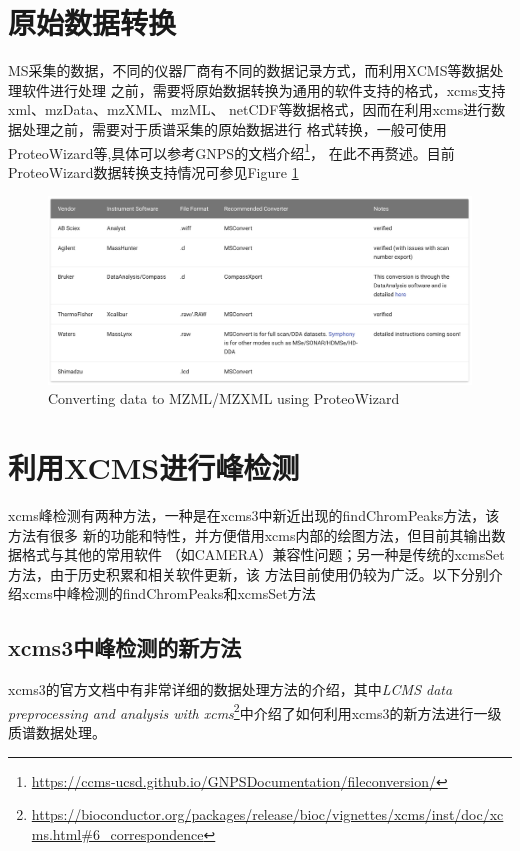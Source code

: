 \documentclass[]{ctexbook}
\renewcommand{\href}[2]{#2\footnote{\url{#1}}}
\begin{document}
\section{原始数据转换}

MS采集的数据，不同的仪器厂商有不同的数据记录方式，而利用XCMS等数据处理软件进行处理
之前，需要将原始数据转换为通用的软件支持的格式，xcms支持xml、mzData、mzXML、mzML、
netCDF等数据格式，因而在利用xcms进行数据处理之前，需要对于质谱采集的原始数据进行
格式转换，一般可使用ProteoWizard等,具体可以参考\href{https://ccms-ucsd.github.io/GNPSDocumentation/fileconversion/}{GNPS的文档介绍}，
在此不再赘述。目前ProteoWizard数据转换支持情况可参见Figure \ref{fig:datacovert}\citep{dtcoversion}

\begin{figure}
\centering
\includegraphics{Figures/Fig4.1.png}
\caption{\label{fig:datacovert}Converting data to MZML/MZXML using ProteoWizard\citep{Wang:2019ig}}
\end{figure}

\hypertarget{xcms}{%
\section{利用XCMS进行峰检测}\label{xcms}}

xcms峰检测有两种方法，一种是在xcms3中新近出现的findChromPeaks方法，该方法有很多
新的功能和特性，并方便借用xcms内部的绘图方法，但目前其输出数据格式与其他的常用软件
（如CAMERA）兼容性问题；另一种是传统的xcmsSet方法，由于历史积累和相关软件更新，该
方法目前使用仍较为广泛。以下分别介绍xcms中峰检测的findChromPeaks和xcmsSet方法

\hypertarget{xcms3}{%
\subsection{xcms3中峰检测的新方法}\label{xcms3}}

xcms3的官方文档中有非常详细的数据处理方法的介绍，其中\href{https://bioconductor.org/packages/release/bioc/vignettes/xcms/inst/doc/xcms.html\#6_correspondence}{\emph{LCMS data preprocessing and analysis with xcms}}中介绍了如何利用xcms3的新方法进行一级质谱数据处理。
\end{document}
